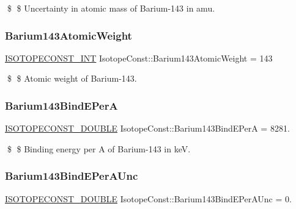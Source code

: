 \$ \$ Uncertainty in atomic mass of Barium-\/143 in amu. \mbox{\label{group___isotope_const-_barium-_ba143_ga7e72b0b40c961e059197130da15276c4}} 
\subsubsection{\texorpdfstring{Barium143\+Atomic\+Weight}{Barium143AtomicWeight}}
{\footnotesize\ttfamily \mbox{\hyperlink{group___isotope_const-_macros_ga5f18360b3e99483a35c32d789e62621c}{I\+S\+O\+T\+O\+P\+E\+C\+O\+N\+S\+T\+\_\+\+I\+NT}} Isotope\+Const\+::\+Barium143\+Atomic\+Weight = 143}

\$ \$ Atomic weight of Barium-\/143. \mbox{\label{group___isotope_const-_barium-_ba143_ga0414fc8ea40ddafc56647ca7955d8dc9}} 
\subsubsection{\texorpdfstring{Barium143\+Bind\+E\+PerA}{Barium143BindEPerA}}
{\footnotesize\ttfamily \mbox{\hyperlink{group___isotope_const-_macros_ga8f45a7272ce02c0b4c65c44636ed719a}{I\+S\+O\+T\+O\+P\+E\+C\+O\+N\+S\+T\+\_\+\+D\+O\+U\+B\+LE}} Isotope\+Const\+::\+Barium143\+Bind\+E\+PerA = 8281.}

\$ \$ Binding energy per A of Barium-\/143 in keV. \mbox{\label{group___isotope_const-_barium-_ba143_ga10e0c61c03ad5b1686eb14402d6381e5}} 
\subsubsection{\texorpdfstring{Barium143\+Bind\+E\+Per\+A\+Unc}{Barium143BindEPerAUnc}}
{\footnotesize\ttfamily \mbox{\hyperlink{group___isotope_const-_macros_ga8f45a7272ce02c0b4c65c44636ed719a}{I\+S\+O\+T\+O\+P\+E\+C\+O\+N\+S\+T\+\_\+\+D\+O\+U\+B\+LE}} Isotope\+Const\+::\+Barium143\+Bind\+E\+Per\+A\+Unc = 0.}

